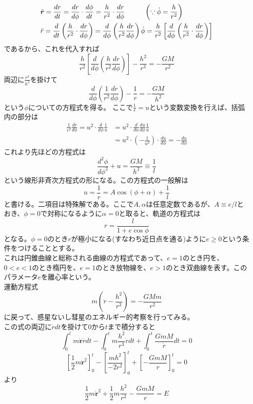 \documentclass{jsarticle}
\begin{document}
\begin{align*}
&\dot{\bm{r}}=\frac{dr}{dt}=\frac{dr}{d\phi}\cdot\frac{d\phi}{dt}=\frac{h}{r^2}\cdot\frac{dr}{d\phi}\hspace{10mm}\left(\because\dot{\phi}=\frac{h}{r^2}\right)\\
&\ddot{r}=\frac{d}{dt}\left(\frac{h}{r^2}\cdot\frac{dr}{d\phi}\right)=\frac{d}{d\phi}\left(\frac{h}{r^2}\frac{dr}{d\phi}\right)\dot{\phi}=\frac{h}{r^2}\left[\frac{d}{d\phi}\left(\frac{h}{r^2}\cdot\frac{dr}{d\phi}\right)\right]
\end{align*}
であるから、これを代入すれば
\[\frac{h}{r^2}\left[\frac{d}{d\phi}\left(\frac{h}{r^2}\frac{dr}{d\phi}\right)\right]-\frac{h^2}{r^3}=-\frac{GM}{r^2}\]
両辺に\(\frac{r^2}{h^2}\)を掛けて
\[\frac{d}{d\phi}\left(\frac{1}{r^2}\frac{dr}{d\phi}\right)-\frac{1}{r}=-\frac{GM}{h^2}\]
という\(\phi\)についての方程式を得る。
ここで\(\displaystyle\frac{1}{r}=u\)という変数変換を行えば、括弧内の部分は
\begin{align*}
\frac{1}{r^2}\frac{dr}{d\phi}=u^2\cdot\frac{d}{d\phi}\frac{1}{u}&=u^2\cdot\frac{d}{du}\frac{du}{d\phi}\frac{1}{u}\\
&=u^2\cdot\left(-\frac{1}{u^2}\right)\cdot\frac{du}{d\phi}=-\frac{du}{d\phi}
\end{align*}
これより先ほどの方程式は
\[\frac{d^2\phi}{d\phi^2}+u=\frac{GM}{h^2}\equiv\frac{1}{l}\]
という線形非斉次方程式の形になる。この方程式の一般解は
\[u=\frac{1}{r}=A\cos(\phi+\alpha)+\frac{1}{l}\]
と書ける。二項目は特殊解である。ここで\(A,\alpha\)は任意定数であるが、\(A\equiv e/l\)とおき、\(\phi=0\)で対称になるように\(\alpha=0\)と取ると、軌道の方程式は
\[r=\frac{l}{1+e\cos\phi}\]
となる。\(\phi=0\)のとき\(r\)が極小になる(すなわち近日点を通る)ように\(e\geq0\)という条件をつけることとする。\\
これは円錐曲線と総称される曲線の方程式であって、\(e=1\)のとき円を、\(0<e<1\)のとき楕円を、\(e=1\)のとき放物線を、\(e>1\)のとき双曲線を表す。このパラメータ\(e\)を離心率という。\\
運動方程式
\[m\left(\ddot{r}-\frac{h^2}{r^3}\right)=-\frac{GMm}{r^2}\]
に戻って、惑星ないし彗星のエネルギー的考察を行ってみる。\\
この式の両辺に\(\dot{r}dt\)を掛けて\(0\)から\(t\)まで積分すると
\[\int_{0}^{t}m\dot{\bm{r}}\ddot{r}dt-\int_{0}^{t}m\frac{h^2}{r^3}\dot{r}dt+\int_{0}^{t}\frac{GmM}{\dot{r}}dt=0\]
\[\left[\frac{1}{2}m\dot{\bm{r}}^2\right]_{0}^{t}-\left[\frac{mh^2}{-2r^2}\right]_{0}^{t}+\left[-\frac{GmM}{r}\right]_{0}^{t}=0\]
より
\[\frac{1}{2}m\dot{\bm{r}}^2+\frac{1}{2}m\frac{h^2}{r^2}-\frac{GmM}{r}=E\]
\end{document}
